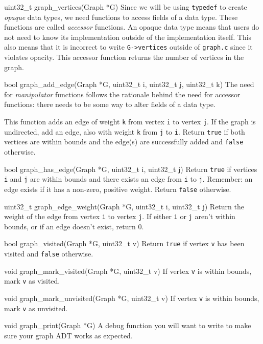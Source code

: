 \begin{funcdoc}{uint32\_t graph\_vertices(Graph *G)}
  Since we will be using \texttt{typedef} to create \emph{opaque} data
  types, we need functions to access fields of a data type. These
  functions are called \emph{accessor} functions. An opaque data type
  means that users do not need to know its implementation outside of the
  implementation itself. This also means that it is incorrect to write
  \texttt{G->vertices} outside of \texttt{graph.c} since it violates
  opacity. This accessor function returns the number of vertices in the
  graph.
\end{funcdoc}

\begin{funcdoc}{bool graph\_add\_edge(Graph *G, uint32\_t i, uint32\_t j, uint32\_t k)}
  The need for \emph{manipulator} functions follows the rationale behind
  the need for accessor functions: there needs to be some way to alter
  fields of a data type.

  This function adds an edge of weight \texttt{k}
  from vertex \texttt{i} to vertex \texttt{j}. If the graph is
  undirected, add an edge, also with weight \texttt{k} from \texttt{j}
  to \texttt{i}. Return \texttt{true} if both vertices are within bounds
  and the edge(s) are successfully added and \texttt{false} otherwise.
\end{funcdoc}

\begin{funcdoc}{bool graph\_has\_edge(Graph *G, uint32\_t i, uint32\_t j)}
  Return \texttt{true} if vertices \texttt{i} and \texttt{j} are within
  bounds and there exists an edge from \texttt{i} to \texttt{j}. Remember:
  an edge exists if it has a non-zero, positive weight. Return
  \texttt{false} otherwise.
\end{funcdoc}

\begin{funcdoc}{uint32\_t graph\_edge\_weight(Graph *G, uint32\_t i, uint32\_t j)}
  Return the weight of the edge from vertex \texttt{i} to vertex
  \texttt{j}. If either \texttt{i} or \texttt{j} aren't within bounds, or
  if an edge doesn't exist, return 0.
\end{funcdoc}

\begin{funcdoc}{bool graph\_visited(Graph *G, uint32\_t v)}
  Return \texttt{true} if vertex \texttt{v} has been visited and
  \texttt{false} otherwise.
\end{funcdoc}

\begin{funcdoc}{void graph\_mark\_visited(Graph *G, uint32\_t v)}
  If vertex \texttt{v} is within bounds, mark \texttt{v} as visited.
\end{funcdoc}

\begin{funcdoc}{void graph\_mark\_unvisited(Graph *G, uint32\_t v)}
  If vertex \texttt{v} is within bounds, mark \texttt{v} as unvisited.
\end{funcdoc}

\begin{funcdoc}{void graph\_print(Graph *G)}
  A debug function you will want to write to make sure your graph ADT
  works as expected.
\end{funcdoc}
